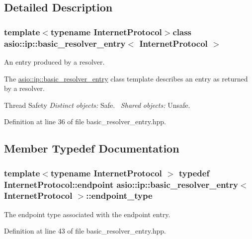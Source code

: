 \subsection{Detailed Description}
\subsubsection*{template$<$typename Internet\+Protocol$>$class asio\+::ip\+::basic\+\_\+resolver\+\_\+entry$<$ Internet\+Protocol $>$}

An entry produced by a resolver. 

The \hyperlink{classasio_1_1ip_1_1basic__resolver__entry}{asio\+::ip\+::basic\+\_\+resolver\+\_\+entry} class template describes an entry as returned by a resolver.

\begin{DoxyParagraph}{Thread Safety}
{\itshape Distinct} {\itshape objects\+:} Safe.~\newline
{\itshape Shared} {\itshape objects\+:} Unsafe. 
\end{DoxyParagraph}


Definition at line 36 of file basic\+\_\+resolver\+\_\+entry.\+hpp.



\subsection{Member Typedef Documentation}
\hypertarget{classasio_1_1ip_1_1basic__resolver__entry_ad0d9f222f3a4897afa941c35e1a90074}{}
\subsubsection[{endpoint\+\_\+type}]{\setlength{\rightskip}{0pt plus 5cm}template$<$typename Internet\+Protocol $>$ typedef Internet\+Protocol\+::endpoint {\bf asio\+::ip\+::basic\+\_\+resolver\+\_\+entry}$<$ Internet\+Protocol $>$\+::{\bf endpoint\+\_\+type}}\label{classasio_1_1ip_1_1basic__resolver__entry_ad0d9f222f3a4897afa941c35e1a90074}


The endpoint type associated with the endpoint entry. 



Definition at line 43 of file basic\+\_\+resolver\+\_\+entry.\+hpp.

